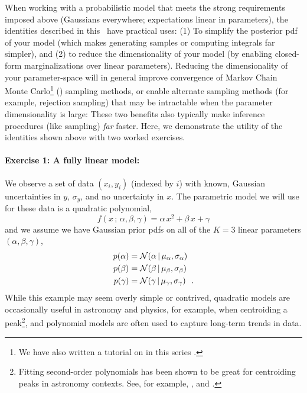 When working with a probabilistic model that meets the strong requirements
imposed above (Gaussians everywhere; expectations linear in parameters),
the identities described in this
\documentname\ have practical uses: (1) To simplify the posterior pdf of your
model (which makes generating samples or computing integrals far simpler), and
(2) to reduce the dimensionality of your model (by enabling closed-form
marginalizations over linear parameters).
Reducing the dimensionality of your parameter-space will in general improve
convergence of Markov Chain Monte Carlo\footnote{We have also written a tutorial
on  in this series \citep{Hogg:2018}.} () sampling
methods, or enable alternate sampling methods (for example, rejection sampling)
that may be intractable when the parameter dimensionality is large: These two
benefits also typically make inference procedures (like sampling) \emph{far}
faster.
Here, we demonstrate the utility of the identities shown above with two
worked exercises.


\paragraph{Exercise 1: A fully linear model:} We observe
a set of data $(x_i, y_i)$ (indexed by $i$) with
known, Gaussian uncertainties in $y$, $\sigma_y$, and no uncertainty in $x$.
The parametric model we will use for these data is a quadratic polynomial,
\begin{equation}
  f(x \,;\, \alpha, \beta, \gamma) = \alpha\,x^2 + \beta\,x + \gamma
\end{equation}
and we assume we have Gaussian prior pdfs on all of the $K=3$ linear parameters
$(\alpha, \beta, \gamma)$,
\begin{align}
  p(\alpha) &= \mathcal{N}\!\,(\alpha \,|\, \mu_\alpha, \sigma_\alpha)\\
  p(\beta) &= \mathcal{N}\!\,(\beta \,|\, \mu_\beta, \sigma_\beta)\\
  p(\gamma) &= \mathcal{N}\!\,(\gamma \,|\, \mu_\gamma, \sigma_\gamma)
  ~~.
\end{align}
While this example may seem overly simple or contrived, quadratic models are
occasionally useful in astronomy and physics, for example, when centroiding a
peak\footnote{Fitting second-order polynomials has been shown to be great for
  centroiding peaks in astronomy contexts. See, for example, \cite{vakili}, and
  \cite{teague}.},
and polynomial models are often used to capture long-term trends in data.

